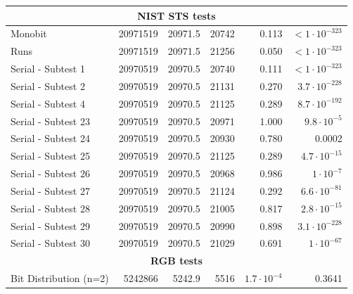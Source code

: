 \documentclass[
	digital,    %
	oneside,    %
	color,
	11pt,
	nocover,
	notable,
	nolof,
	nolot,
]{fithesis3}
\newcommand{\rd}{\cellcolor{red!40}}
\theoremstyle{definition}
\theoremstyle{remark}
\begin{document}
\begin{table}
\begin{nomar}
{\begin{tabular}{@{}lrrrrr@{}}
\multicolumn{6}{c}{\textbf{NIST STS tests}} \\ \midrule
Monobit                        & 20971519          & 20971.5       & 20742         & 0.113                  & $<1\cdot 10^{-323}$   \rd \\
Runs                           & 20971519          & 20971.5       & 21256         & 0.050                  & $<1\cdot 10^{-323}$   \rd \\ 
Serial - Subtest 1             & 20970519          & 20970.5       & 20740         & 0.111                  & $<1\cdot 10^{-323}$   \rd \\
Serial - Subtest 2             & 20970519          & 20970.5       & 21131         & 0.270                  & $3.7 \cdot 10^{-228}$ \rd \\ 
Serial - Subtest 4             & 20970519          & 20970.5       & 21125         & 0.289                  & $8.7 \cdot 10^{-192}$ \rd \\ 
Serial - Subtest 23            & 20970519          & 20970.5       & 20971         & 1.000                  & $9.8 \cdot 10^{-5}$   \rd \\ 
Serial - Subtest 24            & 20970519          & 20970.5       & 20930         & 0.780                  & 0.0002                \rd \\ 
Serial - Subtest 25            & 20970519          & 20970.5       & 21125         & 0.289                  & $4.7 \cdot 10^{-15}$  \rd \\
Serial - Subtest 26            & 20970519          & 20970.5       & 20968         & 0.986                  & $1 \cdot 10^{-7}$     \rd \\
Serial - Subtest 27            & 20970519          & 20970.5       & 21124         & 0.292                  & $6.6 \cdot 10^{-81}$  \rd \\
Serial - Subtest 28            & 20970519          & 20970.5       & 21005         & 0.817                  & $2.8 \cdot 10^{-15}$  \rd \\
Serial - Subtest 29            & 20970519          & 20970.5       & 20990         & 0.898                  & $3.1 \cdot 10^{-228}$ \rd \\
Serial - Subtest 30            & 20970519          & 20970.5       & 21029         & 0.691                  & $1 \cdot 10^{-67}$    \rd \\ \midrule
\multicolumn{6}{c}{\textbf{RGB tests}} \\ \midrule
Bit Distribution (n=2)         & 5242866           & 5242.9        & 5516          & $1.7\cdot 10^{-4}$ \rd & 0.3641                \\

\end{tabular}}
\end{nomar}
\end{table}
\end{document}
